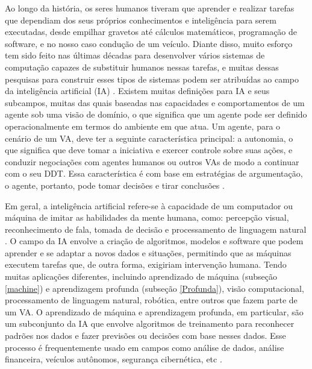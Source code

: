 Ao longo da história, os seres humanos tiveram que aprender e realizar tarefas que dependiam dos seus próprios conhecimentos e inteligência para serem executadas, desde empilhar gravetos até cálculos matemáticos, programação de software, e no nosso caso condução de um veículo. Diante disso, muito esforço tem sido feito nas últimas décadas para desenvolver vários sistemas de computação capazes de substituir humanos nessas tarefas, e muitas dessas pesquisas para construir esses tipos de sistemas podem ser atribuídas ao campo da inteligência artificial (IA) \cite{caio}. 
Existem muitas definições para IA e seus subcampos, muitas das quais baseadas nas capacidades e comportamentos de um agente sob uma visão de domínio, o que significa que um agente pode ser definido operacionalmente em termos do ambiente em que atua.
Um agente, para o cenário de um VA, deve ter a seguinte característica principal: a autonomia, o que significa que deve tomar a iniciativa e exercer controle sobre suas ações, e conduzir negociações com agentes humanos ou outros VAs de modo a continuar com o seu DDT.
Essa característica é com base em estratégias de argumentação, o agente, portanto, pode tomar decisões e tirar conclusões \cite{software-ia}.

Em geral, a inteligência artificial refere-se à capacidade de um computador ou máquina de imitar as habilidades da mente humana, como: percepção visual, reconhecimento de fala, tomada de decisão e processamento de linguagem natural \cite{software-ia}. O campo da IA envolve a criação de algoritmos, modelos e software que podem aprender e se adaptar a novos dados e situações, permitindo que as máquinas executem tarefas que, de outra forma, exigiriam intervenção humana. Tendo muitas aplicações diferentes, incluindo aprendizado de máquina (subseção \ref{machine}) e aprendizagem profunda (subseção \ref{Profunda}), visão computacional, processamento de linguagem natural, robótica, entre outros que fazem parte de um VA. O aprendizado de máquina e aprendizagem profunda, em particular, são um subconjunto da IA que envolve algoritmos de treinamento para reconhecer padrões nos dados e fazer previsões ou decisões com base nesses dados. Esse processo é frequentemente usado em campos como análise de dados, análise financeira, veículos autônomos, segurança cibernética, etc \cite{software-review, software-cnn}.


 \label{machine}

